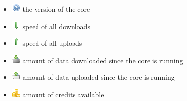 \documentclass[a4paper,10pt]{book}
\begin{document}
\begin{enumerate}
\begin{itemize}
  \item \includegraphics[width=16px]{../small/help.png} the version of the core
  \item \includegraphics[width=16px]{../small/arrow_down.png} speed of all downloads
  \item \includegraphics[width=16px]{../small/arrow_up.png} speed of all uploads
  \item \includegraphics[width=16px]{../small/basket_put.png} amount of data downloaded since the core is running
  \item \includegraphics[width=16px]{../small/basket_remove.png} amount of data uploaded since the core is running
  \item \includegraphics[width=16px]{../small/coins.png} amount of credits available
 \end{itemize}

\end{enumerate}

\end{document}
